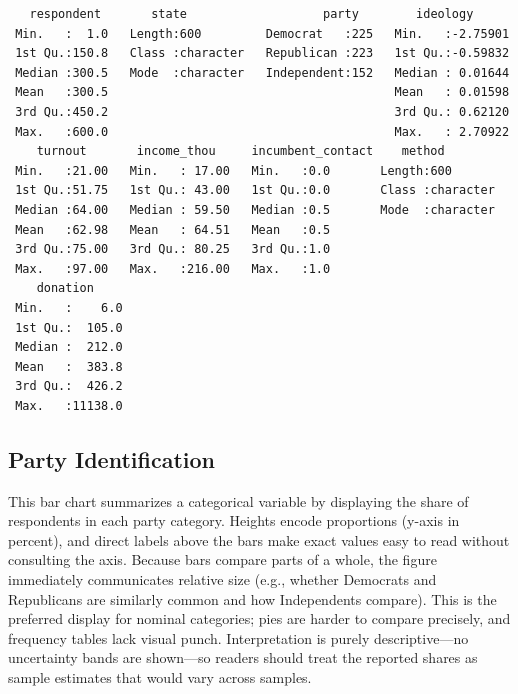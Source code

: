 \documentclass[
  letterpaper,
  DIV=11,
  numbers=noendperiod]{scrreprt}
\begin{document}
\begin{verbatim}
   respondent       state                   party        ideology       
 Min.   :  1.0   Length:600         Democrat   :225   Min.   :-2.75901  
 1st Qu.:150.8   Class :character   Republican :223   1st Qu.:-0.59832  
 Median :300.5   Mode  :character   Independent:152   Median : 0.01644  
 Mean   :300.5                                        Mean   : 0.01598  
 3rd Qu.:450.2                                        3rd Qu.: 0.62120  
 Max.   :600.0                                        Max.   : 2.70922  
    turnout       income_thou     incumbent_contact    method         
 Min.   :21.00   Min.   : 17.00   Min.   :0.0       Length:600        
 1st Qu.:51.75   1st Qu.: 43.00   1st Qu.:0.0       Class :character  
 Median :64.00   Median : 59.50   Median :0.5       Mode  :character  
 Mean   :62.98   Mean   : 64.51   Mean   :0.5                         
 3rd Qu.:75.00   3rd Qu.: 80.25   3rd Qu.:1.0                         
 Max.   :97.00   Max.   :216.00   Max.   :1.0                         
    donation      
 Min.   :    6.0  
 1st Qu.:  105.0  
 Median :  212.0  
 Mean   :  383.8  
 3rd Qu.:  426.2  
 Max.   :11138.0  
\end{verbatim}

\subsection{Party Identification}\label{party-identification}

This bar chart summarizes a categorical variable by displaying the share
of respondents in each party category. Heights encode proportions
(y-axis in percent), and direct labels above the bars make exact values
easy to read without consulting the axis. Because bars compare parts of
a whole, the figure immediately communicates relative size (e.g.,
whether Democrats and Republicans are similarly common and how
Independents compare). This is the preferred display for nominal
categories; pies are harder to compare precisely, and frequency tables
lack visual punch. Interpretation is purely descriptive---no uncertainty
bands are shown---so readers should treat the reported shares as sample
estimates that would vary across samples.
\end{document}
